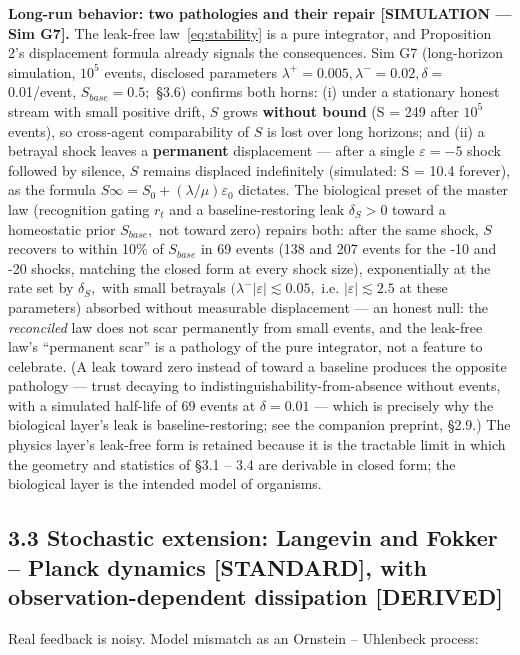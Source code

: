 \documentclass[11pt,twocolumn]{article}
\theoremstyle{gttdef}
\theoremstyle{gttplain}
\begin{document}
\textbf{Long-run behavior: two pathologies and their repair [SIMULATION --- Sim G7].} The leak-free law~\eqref{eq:stability} is a pure integrator, and Proposition 2's displacement formula already signals the consequences. Sim G7 (long-horizon simulation, $10^{5}$ events, disclosed parameters $\lambda^{+} = 0.005, \lambda^{-} = 0.02, \delta =$ 0.01/event, $S_{base} = 0.5;$ \S{}3.6) confirms both horns: (i) under a stationary honest stream with small positive drift, $S$ grows \textbf{without bound} (S = 249 after $10^{5}$ events), so cross-agent comparability of $S$ is lost over long horizons; and (ii) a betrayal shock leaves a \textbf{permanent} displacement --- after a single $\varepsilon = -5$ shock followed by silence, $S$ remains displaced indefinitely (simulated: S = 10.4 forever), as the formula $S\infty = S_{0} + (\lambda/\mu)\varepsilon_{0}$ dictates. The biological preset of the master law (recognition gating $r_t$ and a baseline-restoring leak $\delta_S > 0$ toward a homeostatic prior $S_{base},$ not toward zero) repairs both: after the same shock, $S$ recovers to within 10\% of $S_{base}$ in 69 events (138 and 207 events for the -10 and -20 shocks, matching the closed form at every shock size), exponentially at the rate set by $\delta_S,$ with small betrayals $(\lambda^{-}|\varepsilon| \lesssim 0.05,$ i.e. $|\varepsilon| \lesssim 2.5$ at these parameters) absorbed without measurable displacement --- an honest null: the \emph{reconciled} law does not scar permanently from small events, and the leak-free law's ``permanent scar'' is a pathology of the pure integrator, not a feature to celebrate. (A leak toward zero instead of toward a baseline produces the opposite pathology --- trust decaying to indistinguishability-from-absence without events, with a simulated half-life of 69 events at $\delta = 0.01$ --- which is precisely why the biological layer's leak is baseline-restoring; see the companion preprint, \S{}2.9.) The physics layer's leak-free form is retained because it is the tractable limit in which the geometry and statistics of \S{}3.1 -- 3.4 are derivable in closed form; the biological layer is the intended model of organisms.

\subsection*{3.3 Stochastic extension: Langevin and Fokker -- Planck dynamics [STANDARD], with observation-dependent dissipation [DERIVED]}

Real feedback is noisy. Model mismatch as an Ornstein -- Uhlenbeck process:
\end{document}
